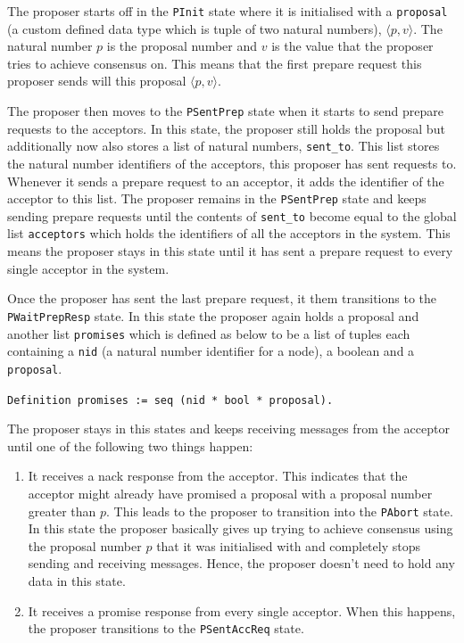The proposer starts off in the \texttt{PInit} state where it is initialised with
a \texttt{proposal} (a custom defined data type which is tuple of two natural numbers),
$\langle p, v \rangle$.
The natural number $p$ is the proposal number and $v$ is the value that the
proposer tries to achieve consensus on. This means that the first prepare
request this proposer sends will this proposal $\langle p, v \rangle$.

The proposer then moves to the \texttt{PSentPrep} state when it starts to send prepare
requests to the acceptors. In this state, the proposer still holds the proposal
but additionally now also stores a list of natural numbers, \texttt{sent\_to}. This list stores the
natural number identifiers of the acceptors, this proposer has sent requests to.
Whenever it sends a prepare request to an acceptor, it adds the identifier of
the acceptor to this list.
The proposer remains in the \texttt{PSentPrep} state and keeps sending prepare requests
until the contents of \texttt{sent\_to} become equal to the global list \texttt{acceptors} which
holds the identifiers of all the acceptors in the system. This means the proposer
stays in this state until it has sent a prepare request to every single acceptor
in the system.

Once the proposer has sent the last prepare request, it them transitions to
the \texttt{PWaitPrepResp} state. In this state the proposer again holds a proposal and
another list \texttt{promises} which is defined as below to be a list of tuples
each containing a \texttt{nid} (a natural number identifier for a node), a boolean
and a \texttt{proposal}.

\texttt{Definition promises := seq (nid * bool * proposal).}

The proposer stays in this states and keeps receiving messages from the acceptor
until one of the following two things happen:
\begin{enumerate}
  \item It receives a nack response from the acceptor. This indicates that the
    acceptor might already have promised a proposal
    with a proposal number greater than $p$. This leads to the proposer to
    transition into the \texttt{PAbort} state. In this state the proposer basically
    gives up trying to achieve consensus using the proposal number $p$ that it was
    initialised with and completely stops sending and receiving messages. Hence,
    the proposer doesn't need to hold any data in this state.
  \item It receives a promise response from every single acceptor. When this
    happens, the proposer transitions to the \texttt{PSentAccReq} state.
\end{enumerate}

